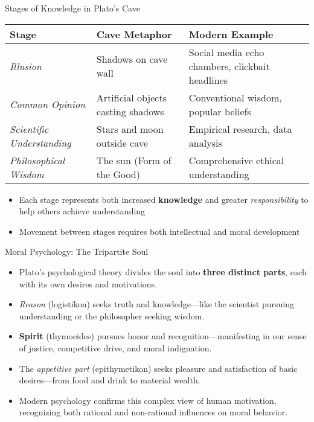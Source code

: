\documentclass[aspectratio=169]{beamer}
\begin{document}
\begin{frame}{Stages of Knowledge in Plato's Cave}
\begin{center}
\begin{tabular}{|p{2.5cm}|p{4cm}|p{4cm}|}
\hline
\textbf{Stage} & \textbf{Cave Metaphor} & \textbf{Modern Example} \\
\hline
\emph{Illusion} & Shadows on cave wall & Social media echo chambers, clickbait headlines \\
\hline
\emph{Common Opinion} & Artificial objects casting shadows & Conventional wisdom, popular beliefs \\
\hline
\emph{Scientific Understanding} & Stars and moon outside cave & Empirical research, data analysis \\
\hline
\emph{Philosophical Wisdom} & The sun (Form of the Good) & Comprehensive ethical understanding \\
\hline
\end{tabular}
\end{center}
\vspace{0.3cm}
\begin{itemize}
\item Each stage represents both increased \textbf{knowledge} and greater \emph{responsibility} to help others achieve understanding
\item Movement between stages requires both intellectual and moral development
\end{itemize}
\end{frame}
\begin{frame}{Moral Psychology: The Tripartite Soul}
\begin{itemize}
\item Plato's psychological theory divides the soul into \textbf{three distinct parts}, each with its own desires and motivations.
\item \emph{Reason} (logistikon) seeks truth and knowledge—like the scientist pursuing understanding or the philosopher seeking wisdom.
\item \textbf{Spirit} (thymoeides) pursues honor and recognition—manifesting in our sense of justice, competitive drive, and moral indignation.
\item The \emph{appetitive part} (epithymetikon) seeks pleasure and satisfaction of basic desires—from food and drink to material wealth.
\item Modern psychology confirms this complex view of human motivation, recognizing both rational and non-rational influences on moral behavior.
\end{itemize}
\end{frame}
\end{document}

